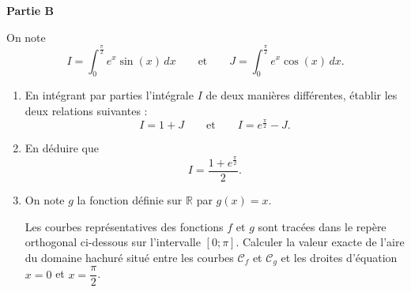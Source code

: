 \documentclass[11pt,a4paper]{article}
\begin{document}
\textbf{Partie B}

On note
\[
I=\int_0^{\frac{\pi}{2}}e^x\sin(x)\,dx\qquad\text{et}\qquad J=\int_0^{\frac{\pi}{2}}e^x\cos(x)\,dx.
\]

\begin{enumerate}
  \item En intégrant par parties l'intégrale $I$ de deux manières différentes, établir les deux relations suivantes :
  \[
  I=1+J\qquad\text{et}\qquad I=e^{\frac{\pi}{2}}-J.
  \]
  \item En déduire que
  \[
  I=\dfrac{1+e^{\frac{\pi}{2}}}{2}.
  \]
  \item On note $g$ la fonction définie sur $\mathbb R$ par $g(x)=x$.

  Les courbes représentatives des fonctions $f$ et $g$ sont tracées dans le repère orthogonal ci-dessous sur l'intervalle $[0;\pi]$.
  Calculer la valeur exacte de l'aire du domaine hachuré situé entre les courbes $\mathcal C_f$ et $\mathcal C_g$ et les droites d'équation $x=0$ et $x=\dfrac{\pi}{2}$.
\end{enumerate}

\begin{center}
\end{center}

\newpage
\end{document}
